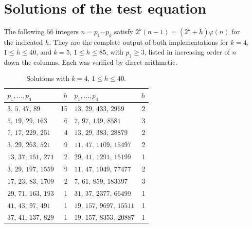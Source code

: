 \documentclass[11pt,reqno]{amsart}
\numberwithin{equation}{section}
\theoremstyle{plain}
\theoremstyle{definition}
\theoremstyle{remark}
\begin{document}
\appendix
\section{Solutions of the test equation}\label{app:tests}

The following $56$ integers $n=p_1\cdots p_k$ satisfy
$2^k(n-1)=(2^k+h)\varphi(n)$ for the indicated $h$. They are the
complete output of both implementations for $k=4$, $1\le h\le40$, and
$k=5$, $1\le h\le85$, with $p_1\ge3$, listed in increasing order of
$n$ down the columns. Each was verified by direct arithmetic.

\begin{table}[ht]
\centering
\caption{Solutions with $k=4$, $1\le h\le40$.}
\label{tab:S4}
\smallskip
\footnotesize
\begin{tabular}{@{}lr@{\qquad}lr@{}}
\toprule
$p_1,\dots,p_4$ & $h$ & $p_1,\dots,p_4$ & $h$ \\
\midrule
$3,\,5,\,47,\,89$ & 15 & $13,\,29,\,433,\,2969$ & 2 \\
$5,\,19,\,29,\,163$ & 6 & $7,\,97,\,139,\,8581$ & 3 \\
$7,\,17,\,229,\,251$ & 4 & $13,\,29,\,383,\,28879$ & 2 \\
$3,\,29,\,263,\,521$ & 9 & $11,\,47,\,1109,\,15497$ & 2 \\
$13,\,37,\,151,\,271$ & 2 & $29,\,41,\,1291,\,15199$ & 1 \\
$3,\,29,\,197,\,1559$ & 9 & $11,\,47,\,1049,\,77477$ & 2 \\
$17,\,23,\,83,\,1709$ & 2 & $7,\,61,\,859,\,183397$ & 3 \\
$29,\,71,\,163,\,193$ & 1 & $31,\,37,\,2377,\,66499$ & 1 \\
$41,\,43,\,97,\,491$ & 1 & $19,\,157,\,9697,\,15511$ & 1 \\
$37,\,41,\,137,\,829$ & 1 & $19,\,157,\,8353,\,20887$ & 1 \\
\bottomrule
\end{tabular}
\end{table}
\end{document}
